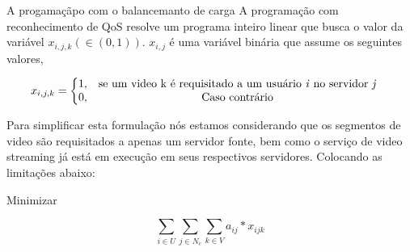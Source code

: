 A progamaçãpo com o balancemanto de carga   
A programação com reconhecimento de QoS resolve um programa inteiro linear que busca o valor da variável $x_{i,j,k} (\in (0, 1))$. $x_{i,j}$ é uma variável binária que assume os seguintes valores,

\vspace{0.5cm}
\begin{equation}\label{total_capacity_loss}
x_{i,j,k} =
\left\{\begin{matrix}
1, & \text{se um video k é requisitado a um usuário \textit{i} no servidor \textit{j}} & \\ 
0, & \text{Caso contrário} & 
\end{matrix}\right.
\end{equation}
\vspace{0.5cm}

%


Para simplificar esta formulação nós estamos considerando que os segmentos de video são requisitados a apenas um servidor fonte, bem como o serviço de video streaming já está em execução em seus respectivos servidores. Colocando as limitações abaixo:%


\vspace{0.5cm}


Minimizar

\begin{equation}\label{maximize}
\sum_{i \in U} 
\sum_{j \in N_{c}}
\sum_{k \in V}
a_{ij} \ast x_{ijk}
\end{equation}

